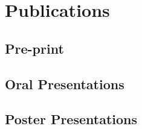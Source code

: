\documentclass[10pt, letterpaper]{article}
\begin{document}
\section{Publications}
\subsection{Pre-print}
\begin{refsection}


  

\end{refsection}

\subsection{Oral Presentations}
\begin{refsection}


  

\end{refsection}

\subsection{Poster Presentations}
\begin{refsection}

  
  

\end{refsection}
\end{document}
